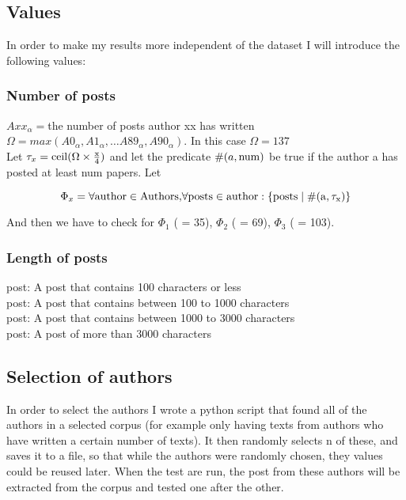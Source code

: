 \subsection{Values}
In order to make my results more independent of the dataset I will introduce the following values:

\subsubsection*{Number of posts}
$Axx_{\alpha} = $the number of posts author xx has written\\ 
$\Omega = max(A0_\alpha, A1_\alpha, \ldots A89_\alpha, A90_\alpha)$. In this case $\Omega = 137$\\

Let $\tau_x = \rm{ceil}(\Omega \times \frac{x}{4})$ and let the predicate $\#(a, \rm{num})$ be true if the author a has posted at least num papers. Let 

$$\Phi_x = \forall\rm{ author }\in\rm{ Authors, }\forall\rm{ posts }\in\rm{ author }: \{\rm{posts }\mid \#(a, \tau_x)\}$$ 
 
And then we have to check for $\Phi_1$ ( = 35), $\Phi_2$ ( = 69), $\Phi_3$ ( = 103).

\subsubsection*{Length of posts}
 post: A post that contains 100 characters or less\\
 post: A post that contains between 100 to 1000 characters\\
 post: A post that contains between 1000 to 3000 characters\\
 post: A post of more than 3000 characters


\subsection{Selection of authors}
In order to select the authors I wrote a python script that found all of the authors in a selected corpus (for example only having texts from authors who have written a certain number of texts). It then randomly selects n of these, and saves it to a file, so that while the authors were randomly chosen, they values could be reused later. When the test are run, the post from these authors will be extracted from the corpus and tested one after the other.


